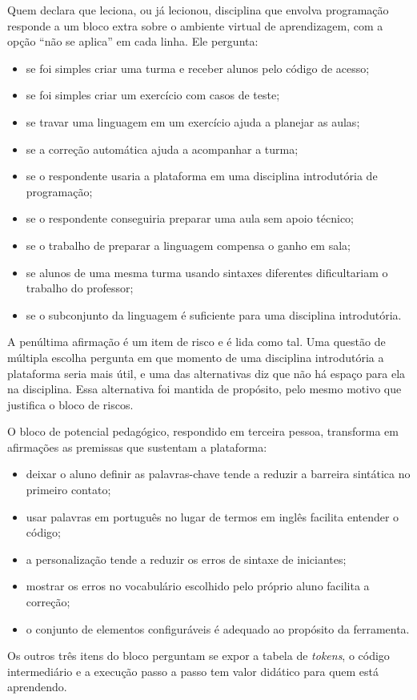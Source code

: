 Quem declara que leciona, ou já lecionou, disciplina que envolva programação responde a um bloco extra sobre o ambiente virtual de aprendizagem, com a opção ``não se aplica'' em cada linha. Ele pergunta:

\begin{itemize}
    \item se foi simples criar uma turma e receber alunos pelo código de acesso;
    \item se foi simples criar um exercício com casos de teste;
    \item se travar uma linguagem em um exercício ajuda a planejar as aulas;
    \item se a correção automática ajuda a acompanhar a turma;
    \item se o respondente usaria a plataforma em uma disciplina introdutória de programação;
    \item se o respondente conseguiria preparar uma aula sem apoio técnico;
    \item se o trabalho de preparar a linguagem compensa o ganho em sala;
    \item se alunos de uma mesma turma usando sintaxes diferentes dificultariam o trabalho do professor;
    \item se o subconjunto da linguagem é suficiente para uma disciplina introdutória.
\end{itemize}
 A penúltima afirmação é um item de risco e é lida como tal. Uma questão de múltipla escolha pergunta em que momento de uma disciplina introdutória a plataforma seria mais útil, e uma das alternativas diz que não há espaço para ela na disciplina. Essa alternativa foi mantida de propósito, pelo mesmo motivo que justifica o bloco de riscos.

O bloco de potencial pedagógico, respondido em terceira pessoa, transforma em afirmações as premissas que sustentam a plataforma:

\begin{itemize}
    \item deixar o aluno definir as palavras-chave tende a reduzir a barreira sintática no primeiro contato;
    \item usar palavras em português no lugar de termos em inglês facilita entender o código;
    \item a personalização tende a reduzir os erros de sintaxe de iniciantes;
    \item mostrar os erros no vocabulário escolhido pelo próprio aluno facilita a correção;
    \item o conjunto de elementos configuráveis é adequado ao propósito da ferramenta.
\end{itemize}
 Os outros três itens do bloco perguntam se expor a tabela de \textit{tokens}, o código intermediário e a execução passo a passo tem valor didático para quem está aprendendo.

